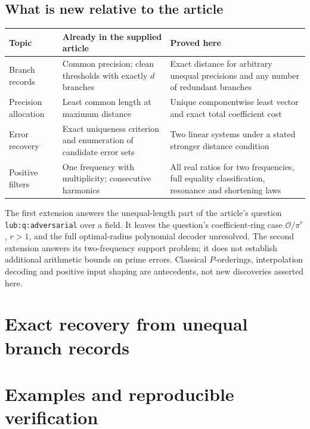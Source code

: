 \documentclass[11pt]{article}
\theoremstyle{definition}\newtheorem{definition}[theorem]{Definition}
\theoremstyle{remark}\newtheorem{remark}[theorem]{Remark}
\begin{document}
\subsection{What is new relative to the article}

\begin{center}\small
\begin{tabularx}{\textwidth}{@{}p{}XX@{}}
\toprule
Topic & Already in the supplied article & Proved here\\
\midrule
Branch records & Common precision; clean thresholds with exactly $d$ branches &
Exact distance for arbitrary unequal precisions and any number of redundant branches\\
Precision allocation & Least common length at maximum distance &
Unique componentwise least vector and exact total coefficient cost\\
Error recovery & Exact uniqueness criterion and enumeration of candidate error sets &
Two linear systems under a stated stronger distance condition\\
Positive filters & One frequency with multiplicity; consecutive harmonics &
All real ratios for two frequencies, full equality classification, resonance and shortening laws\\
\bottomrule
\end{tabularx}
\end{center}

The first extension answers the unequal-length part of the article's question
\texttt{lub:q:adversarial} over a field. It leaves the question's coefficient-ring
case $\mathcal O/\pi^r$, $r>1$, and the full optimal-radius polynomial decoder
unresolved. The second extension answers its two-frequency support problem;
it does not establish additional arithmetic bounds on prime errors.
Classical $P$-orderings, interpolation decoding and positive input shaping
are antecedents, not new discoveries asserted here.

\section{Exact recovery from unequal branch records}
\label{sec:jets}




\section{Examples and reproducible verification}
\label{sec:verification}
\end{document}
